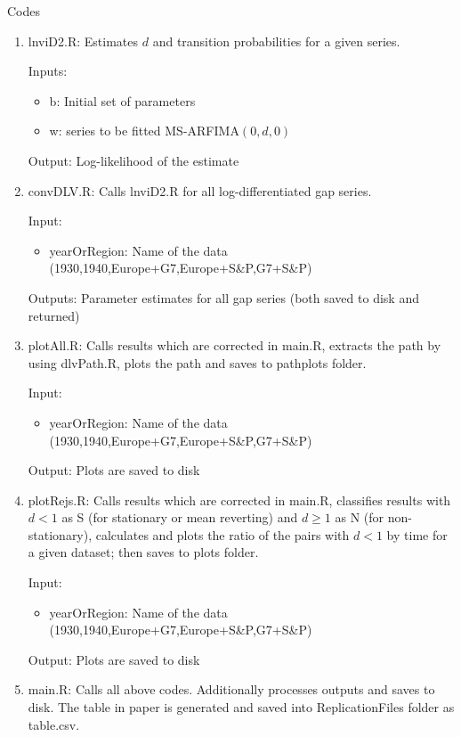 \documentclass{article}
\begin{document}
\begin{flushleft}
	\large Codes
\end{flushleft}
\begin{enumerate}
	\item lnviD2.R: Estimates $ d $ and transition probabilities for a given series.

	Inputs:
		 \begin{itemize}
		 	\item b: Initial set of parameters
		 	\item w: series to be fitted MS-ARFIMA$ (0,d,0) $
		 \end{itemize}
		 
	Output: Log-likelihood of the estimate
		 
	\item convDLV.R: Calls lnviD2.R for all log-differentiated gap series.
	
		Input:
		\begin{itemize}
			
			\item yearOrRegion: Name of the data (1930,1940,Europe+G7,Europe+S\&P,G7+S\&P)

		\end{itemize}
		
		Outputs: Parameter estimates for all gap series (both saved to disk and returned)
		
	\item plotAll.R: Calls results which are corrected in main.R, extracts the path by using dlvPath.R, plots the path and saves to pathplots folder.
	
	Input:
	\begin{itemize}
		
		\item yearOrRegion: Name of the data (1930,1940,Europe+G7,Europe+S\&P,G7+S\&P)
		
	\end{itemize}
	
	Output: Plots are saved to disk
	
		\item plotRejs.R: Calls results which are corrected in main.R, classifies results with $ d<1 $ as S (for stationary or mean reverting) and $ d\geq 1 $ as N (for non-stationary), calculates and plots the ratio of the pairs with $ d<1 $ by time for a given dataset; then saves to plots folder.
		
		Input:
		\begin{itemize}
			
			\item yearOrRegion: Name of the data (1930,1940,Europe+G7,Europe+S\&P,G7+S\&P)
			
		\end{itemize}
		
		Output: Plots are saved to disk

	\item main.R: Calls all above codes. Additionally processes outputs and saves to disk. The table in paper is generated and saved into ReplicationFiles folder as table.csv.
	
\end{enumerate}
\end{document}
